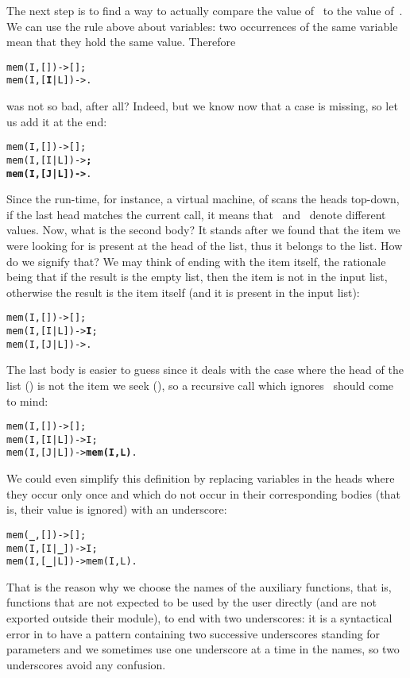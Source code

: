 The next step is to find a way to actually compare the value
of~ to the value of~. We can use the rule above
about variables: two occurrences of the same variable mean that they
hold the same value. Therefore
\begin{alltt}
mem(I,   []) -> [];
mem(I,[\textbf{I}|L]) -> .
\end{alltt}
was not so bad, after all? Indeed, but we know now that a case is
missing, so let us add it at the end:
\begin{alltt}
mem(I,   []) -> [];
mem(I,[I|L]) -> \textbf{;}
\textbf{mem(I,[J|L]) ->} .\hfill% I \(\neq\) J
\end{alltt}
Since the run\hyp{}time, for instance, a virtual machine, of \Erlang
scans the heads top\hyp{}down, if the last head matches the current
call, it means that ~and~ denote different
values. Now, what is the second body? It stands after we found that
the item we were looking for is present at the head of the list, thus
it belongs to the list. How do we signify that? We may think of ending
with the item itself, the rationale being that if the result is the
empty list, then the item is not in the input list, otherwise the
result is the item itself (and it is present in the input list):
\begin{alltt}
mem(I,   []) -> [];
mem(I,[I|L]) -> \textbf{I};\hfill% \emph{Ignoring} L
mem(I,[J|L]) -> .
\end{alltt}
The last body is easier to guess since it deals with the case where
the head of the list () is not the item we seek
(), so a recursive call which ignores~ should
come to mind:
\begin{alltt}
mem(I,   []) -> [];
mem(I,[I|L]) -> I;
mem(I,[J|L]) -> \textbf{mem(I,L)}.\hfill% \emph{Ignoring} J
\end{alltt}
We could even simplify this definition by replacing variables in the
heads where they occur only once and which do not occur in their
corresponding bodies (that is, their value is ignored) with an
underscore:
\begin{alltt}
mem(\textbf{\_},   []) -> [];\hfill% \emph{Here,}
mem(I,[I|\textbf{\_}]) -> I;\hfill% \emph{here}
mem(I,[\textbf{\_}|L]) -> mem(I,L).\hfill% \emph{and here}
\end{alltt}
That is the reason why we choose the names of the auxiliary functions,
that is, functions that are not expected to be used by the user
directly (and are not exported outside their module), to end with two
underscores: it is a syntactical error in \Erlang to have a pattern
containing two successive underscores standing for parameters and we
sometimes use one underscore at a time in the names, so two
underscores avoid any confusion.

